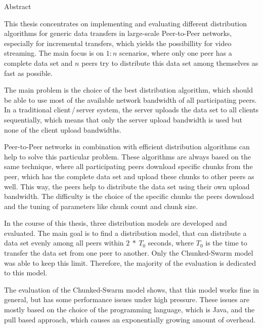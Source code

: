 
\begin{center} 
\huge Abstract
\end{center}


This thesis concentrates on implementing and evaluating different distribution algorithms for generic data transfers in large-scale Peer-to-Peer networks, especially for incremental transfers, which yields the possibillity for video streaming. The main focus is on $1:n$ scenarios, where only one peer has a complete data set and $n$ peers try to distribute this data set among themselves as fast as possible.

The main problem is the choice of the best distribution algorithm, which should be able to use most of the available network bandwidth of all participating peers. In a traditional client\,/\,server system, the server uploads the data set to all clients sequentially, which means that only the server upload bandwidth is used but none of the client upload bandwidths.

Peer-to-Peer networks in combination with efficient distribution algorithms can help to solve this particular problem. These algorithms are always based on the same technique, where all participating peers download specific chunks from the peer, which has the complete data set and upload these chunks to other peers as well. This way, the peers help to distribute the data set using their own upload bandwidth. The difficulty is the choice of the specific chunks the peers download and the tuning of parameters like chunk count and chunk size.

In the course of this thesis, three distribution models are developed and evaluated. The main goal is to find a distribution model, that can distribute a data set evenly among all peers within $2\:*\:T_0$ seconds, where $T_0$ is the time to transfer the data set from one peer to another. Only the Chunked-Swarm model was able to keep this limit. Therefore, the majority of the evaluation is dedicated to this model.

The evaluation of the Chunked-Swarm model shows, that this model works fine in general, but has some performance issues under high pressure. These issues are mostly based on the choice of the programming language, which is Java, and the pull based approach, which causes an exponentially growing amount of overhead. 